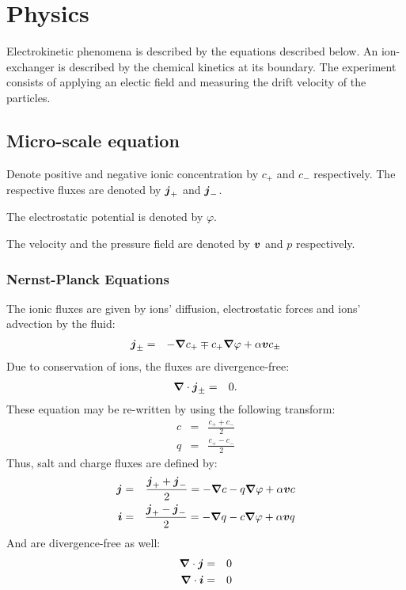 \section{Physics}
Electrokinetic phenomena is described by the equations described below.
An ion-exchanger is described by the chemical kinetics at its boundary.
The experiment consists of applying an electic field and measuring the drift velocity of the particles.

\subsection{Micro-scale equation}
Denote positive and negative ionic concentration by $c_+$ and $c_-$ respectively.
The respective fluxes are denoted by $\boldsymbol{j}_+$ and $\boldsymbol{j}_-$.

The electrostatic potential is denoted by $\varphi$. 

The velocity and the pressure field are denoted by $\boldsymbol{v}$ and $p$ respectively.

\subsubsection{Nernst-Planck Equations}
The ionic fluxes are given by ions' diffusion, electrostatic forces and ions' advection by the fluid:
\begin{eqnarray}
 \nonumber \boldsymbol{j}_\pm &=& -\boldsymbol{\nabla} c_+ \mp c_+ \boldsymbol{\nabla} \varphi + \alpha \boldsymbol{v} c_\pm
\end{eqnarray}
Due to conservation of ions, the fluxes are divergence-free:
\begin{eqnarray}
\boldsymbol{\nabla} \cdot \boldsymbol{j}_\pm &=& 0.
\end{eqnarray}
These equation may be re-written by using the following transform:
\begin{eqnarray}
 \nonumber c &=& \frac{c_+ + c_-}{2}\\
 \nonumber q &=& \frac{c_+ - c_-}{2}
\end{eqnarray}
Thus, salt and charge fluxes are defined by:
\begin{eqnarray}
 \nonumber \boldsymbol{j} &=& \frac{\boldsymbol{j}_+ + \boldsymbol{j}_-}{2} = -\boldsymbol{\nabla} c - q \boldsymbol{\nabla} \varphi + \alpha \boldsymbol{v} c \\
 \nonumber \boldsymbol{i} &=& \frac{\boldsymbol{j}_+ - \boldsymbol{j}_-}{2} = -\boldsymbol{\nabla} q - c \boldsymbol{\nabla} \varphi + \alpha \boldsymbol{v} q
\end{eqnarray}
And are divergence-free as well:
\begin{eqnarray}
\boldsymbol{\nabla} \cdot \boldsymbol{j} &=& 0 \\
\boldsymbol{\nabla} \cdot \boldsymbol{i} &=& 0 
\end{eqnarray}

